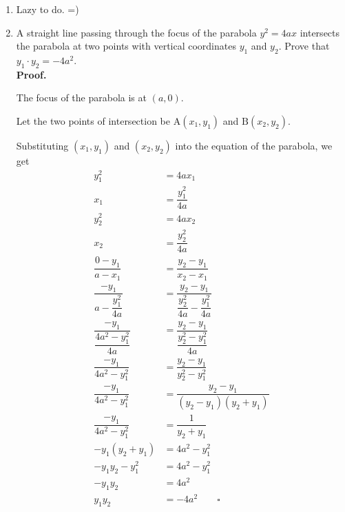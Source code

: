 \documentclass{report}
\newcommand{\proof}{\vspace{1em}\\\textbf{Proof.}}
\newcommand{\eos}{ \qquad \square}
\begin{document}
\begin{enumerate}
    \item Lazy to do. =)

    \item A straight line passing through the focus of the parabola $y^2=4ax$ intersects
          the parabola at two points with vertical coordinates $y_1$ and $y_2$. Prove
          that $y_1 \cdot y_2 = -4a^2$. \proof{}

          The focus of the parabola is at $(a, 0)$.

          Let the two points of intersection be $\mathrm{A}(x_1, y_1)$ and
          $\mathrm{B}(x_2, y_2)$.

          Substituting $(x_1, y_1)$ and $(x_2, y_2)$ into the equation of the parabola,
          we get
          \begin{align*}
              y_1^2                                  & = 4ax_1                                                    \\
              x_1                                    & = \dfrac{y_1^2}{4a}                                        \\
              y_2^2                                  & = 4ax_2                                                    \\
              x_2                                    & = \dfrac{y_2^2}{4a}                                        \\
              \dfrac{0 - y_1}{a - x_1}               & = \dfrac{y_2 - y_1}{x_2 - x_1}                             \\
              \dfrac{-y_1}{a - \dfrac{y_1^2}{4a}}    & = \dfrac{y_2 - y_1}{\dfrac{y_2^2}{4a} - \dfrac{y_1^2}{4a}} \\
              \dfrac{-y_1}{\dfrac{4a^2 - y_1^2}{4a}} & = \dfrac{y_2 - y_1}{\dfrac{y_2^2 - y_1^2}{4a}}             \\
              \dfrac{-y_1}{4a^2 - y_1^2}             & = \dfrac{y_2 - y_1}{y_2^2 - y_1^2}                         \\
              \dfrac{-y_1}{4a^2 - y_1^2}             & = \dfrac{y_2 - y_1}{(y_2 - y_1)(y_2 + y_1)}                \\
              \dfrac{-y_1}{4a^2 - y_1^2}             & = \dfrac{1}{y_2 + y_1}                                     \\
              -y_1(y_2 + y_1)                        & = 4a^2 - y_1^2                                             \\
              -y_1y_2 - y_1^2                        & = 4a^2 - y_1^2                                             \\
              -y_1y_2                                & = 4a^2                                                     \\
              y_1y_2                                 & = -4a^2 \eos
          \end{align*}


\end{enumerate}
\end{document}
